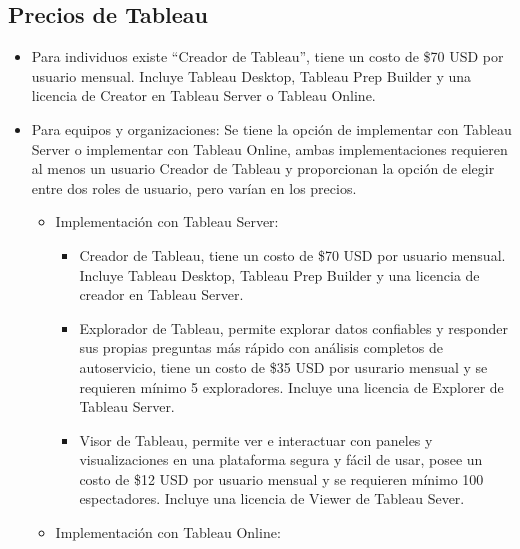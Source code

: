 \documentclass[
]{book}
\providecommand{\tightlist}{%
  \setlength{\itemsep}{0pt}\setlength{\parskip}{0pt}}
\begin{document}
\hypertarget{precios-de-tableau}{%
\subsection{Precios de Tableau}\label{precios-de-tableau}}

\begin{itemize}
\item
  Para individuos existe ``Creador de Tableau'', tiene un costo de \$70 USD por usuario mensual. Incluye Tableau Desktop, Tableau Prep Builder y una licencia de Creator en Tableau Server o Tableau Online.
\item
  Para equipos y organizaciones: Se tiene la opción de implementar con Tableau Server o implementar con Tableau Online, ambas implementaciones requieren al menos un usuario Creador de Tableau y proporcionan la opción de elegir entre dos roles de usuario, pero varían en los precios.

  \begin{itemize}
  \tightlist
  \item
    Implementación con Tableau Server:

    \begin{itemize}
    \tightlist
    \item
      Creador de Tableau, tiene un costo de \$70 USD por usuario mensual. Incluye Tableau Desktop, Tableau Prep Builder y una licencia de creador en Tableau Server.
    \item
      Explorador de Tableau, permite explorar datos confiables y responder sus propias preguntas más rápido con análisis completos de autoservicio, tiene un costo de \$35 USD por usurario mensual y se requieren mínimo 5 exploradores. Incluye una licencia de Explorer de Tableau Server.
    \item
      Visor de Tableau, permite ver e interactuar con paneles y visualizaciones en una plataforma segura y fácil de usar, posee un costo de \$12 USD por usuario mensual y se requieren mínimo 100 espectadores. Incluye una licencia de Viewer de Tableau Sever.
    \end{itemize}
  \item
    Implementación con Tableau Online:


\end{itemize}
\end{itemize}
\end{document}
